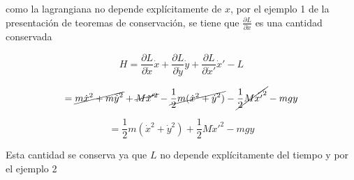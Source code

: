 \documentclass[12pt,a4paper]{article}
\begin{document}
\begin{enumerate}
        
        
        como la lagrangiana no depende explícitamente de $x$, por el ejemplo 1 de la presentación de teoremas de conservación, se tiene que $\frac{\partial L}{\partial \dot{x}}$ es una cantidad conservada
        
        \begin{equation*}
            H = \frac{\partial L}{\partial \dot{x}} \dot{x} + \frac{\partial L}{\partial \dot{y}}  \dot{y} + \frac{\partial L}{\partial \dot{x}'} \dot{x}' - L
        \end{equation*}
        
        \begin{equation*}
            = \cancel{m \dot{x}^2 + m  \dot{y}^2 }+ \cancel{M \dot{x}'^2}  - \cancel{\frac{1}{2}m (\dot{x}^2 + \dot{y}^2) }- \cancel{\frac{1}{2}M \dot{x'}^2} - mgy
        \end{equation*}
        
        \begin{equation*}
            = \frac{1}{2}m (\dot{x}^2 + \dot{y}^2) + \frac{1}{2} M \dot{x}'^2 - mgy
        \end{equation*}
        
        Esta cantidad se conserva ya que $L$ no depende explícitamente del tiempo  y por el ejemplo 2
        
        
        
        
        

    
\end{enumerate}
\end{document}
